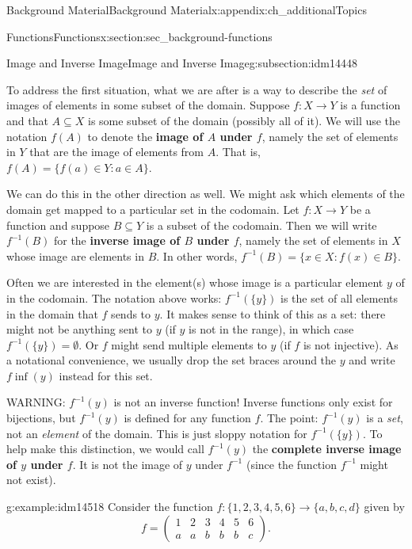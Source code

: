 \documentclass[oneside,10pt,]{book}
\newcommand{\terminology}[1]{\textbf{#1}}
\numberwithin{equation}{chapter}
\def\inv{^{-1}}
\def\st{:}
\newcommand{\amp}{&}
\begin{document}
\begin{appendixptx}{Background Material}{}{Background Material}{}{}{x:appendix:ch_additionalTopics}
\begin{sectionptx}{Functions}{}{Functions}{}{}{x:section:sec_background-functions}
\begin{subsectionptx}{Image and Inverse Image}{}{Image and Inverse Image}{}{}{g:subsection:idm14448}
\par
To address the first situation, what we are after is a way to describe the \emph{set} of images of elements in some subset of the domain.  Suppose \(f:X \to Y\) is a function and that \(A \subseteq X\) is some subset of the domain (possibly all of it).  We will use the notation \(f(A)\) to denote the \terminology{image of \(A\) under \(f\)}, namely the set of elements in \(Y\) that are the image of elements from \(A\).  That is, \(f(A) = \{f(a) \in Y \st a \in A\}\). \label{g:notation:idm14470}%
\par
We can do this in the other direction as well.  We might ask which elements of the domain get mapped to a particular set in the codomain.  Let \(f:X \to Y\) be a function and suppose \(B \subseteq Y\) is a subset of the codomain.  Then we will write \(f\inv(B)\) for the \terminology{inverse image of \(B\) under \(f\)}, namely the set of elements in \(X\) whose image are elements in \(B\).  In other words, \(f\inv(B) = \{x \in X \st f(x) \in B\}\). \label{g:notation:idm14485}%
\par
Often we are interested in the element(s) whose image is a particular element \(y\) of in the codomain.  The notation above works: \(f\inv(\{y\})\) is the set of all elements in the domain that \(f\) sends to \(y\).  It makes sense to think of this as a set: there might not be anything sent to \(y\) (if \(y\) is not in the range), in which case \(f\inv(\{y\}) = \emptyset\).  Or \(f\) might send multiple elements to \(y\) (if \(f\) is not injective).  As a notational convenience, we usually drop the set braces around the \(y\) and write \(f\inf(y)\) instead for this set.%
\par
WARNING: \(f\inv(y)\) is not an inverse function! Inverse functions only exist for bijections, but \(f\inv(y)\) is defined for any function \(f\). The point: \(f\inv(y)\) is a \emph{set}, not an \emph{element} of the domain.  This is just sloppy notation for \(f\inv(\{y\})\).  To help make this distinction, we would call \(f\inv(y)\) the \terminology{complete inverse image of \(y\) under \(f\)}.  It is not the image of \(y\) under \(f\inv\) (since the function \(f\inv\) might not exist).%
\begin{example}{}{g:example:idm14518}%
Consider the function \(f:\{1,2,3,4,5,6\} \to \{a,b,c,d\}\) given by%
\begin{equation*}
f = \begin{pmatrix}1 \amp 2 \amp 3 \amp 4 \amp 5 \amp 6 \\ a \amp a \amp b \amp b \amp b \amp c\end{pmatrix}.

\end{equation*}
\end{example}
\end{subsectionptx}
\end{sectionptx}
\end{appendixptx}
\end{document}
